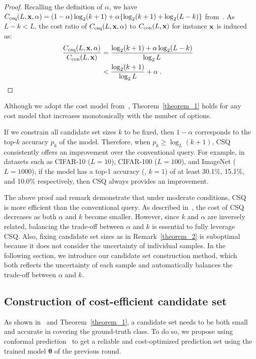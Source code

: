 \begin{proof}\renewcommand{\qedsymbol}{}
    Recalling the definition of $\alpha$, we have $C_{\textnormal{csq}} (L, \mathbf{x}, \alpha)= (1 - \alpha) \log_2 (k+1) + \alpha \{ \log_2 (k+1) + \log_2 (L-k) \}$ from~.
    As $ L-k < L $, the cost ratio of $C_{\textnormal{csq}} (L, \mathbf{x}, \alpha)$ to $C_{\textnormal{con}} (L, \mathbf{x})$ for instance $\mathbf{x}$ is induced as:
    \begin{align}
        \nonumber \frac{C_{\textnormal{csq}} (L, \mathbf{x}, \alpha)}{C_{\textnormal{con}}(L, \mathbf{x})} &= \frac{\log_2 (k+1) + \alpha \log_2 (L-k)}{\log_2 L} \\
        & < \frac{\log_2 (k+1)}{\log_2 L} + \alpha \;.
        \label{eq:ratio}
    \end{align}
\end{proof}
Although we adopt the cost model from~\citet{hu2020one}, Theorem~\ref{theorem_1} holds for any cost model that increases monotonically with the number of options.
\begin{remark}
\label{theorem_2}
If we constrain all candidate set sizes $k$ to be fixed, then $1 - \alpha$ corresponds to the top-$k$ accuracy $p_k$ of the model.
Therefore, when $p_k \geq \log_L (k+1)$, CSQ consistently offers an improvement over the conventional query.
For example, in datasets such as CIFAR-10 ($L=10$), CIFAR-100 ($L=100$), and ImageNet ($L=1000$), if the model has a top-1 accuracy (\ie, $k=1$) of at least 30.1\%, 15.1\%, and 10.0\% respectively, then CSQ always provides an improvement.
\end{remark}
The above proof and remark demonstrate that under moderate conditions, CSQ is more efficient than the conventional query.
As described in~, the cost of CSQ decreases as both $\alpha$ and $k$ become smaller.
However, since $k$ and $\alpha$ are inversely related,
balancing the trade-off between $\alpha$ and $k$ is essential to fully leverage CSQ.
Also, fixing candidate set sizes as in Remark~\ref{theorem_2} is suboptimal because it does not consider the uncertainty of individual samples.
In the following section, we introduce our candidate set construction method, which both reflects the uncertainty of each sample and automatically balances the trade-off between $\alpha$ and $k$.

\subsection{Construction of cost-efficient candidate set}
\label{sec:candidate_set_construction}
As shown in~ and Theorem~\ref{theorem_1}, a candidate set needs to be both small and accurate in covering the ground-truth class.
To do so, we propose using conformal prediction~\citep{romano2020classification} to get a reliable and cost-optimized prediction set using the trained model $\boldsymbol{\theta}$ of the previous round.

